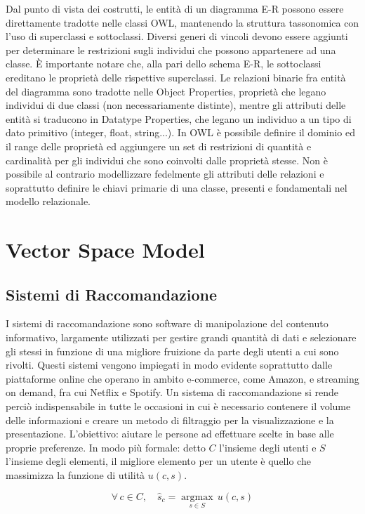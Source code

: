 \documentclass[Lau,binding=0.6cm,noexaminfo,oneside]{sapthesis}
\newcommand{\argmax}{\mathop{\mathrm{argmax}}\limits}
\begin{document}
Dal punto di vista dei costrutti, le entità di un diagramma E-R possono essere direttamente tradotte nelle classi OWL, mantenendo la struttura tassonomica con l'uso di superclassi e sottoclassi. Diversi generi di vincoli devono essere aggiunti per determinare le restrizioni sugli individui che possono appartenere ad una classe. \MakeUppercase{è} importante notare che, alla pari dello schema E-R, le sottoclassi ereditano le proprietà delle rispettive superclassi.
Le relazioni binarie fra entità del diagramma sono tradotte nelle Object Properties, proprietà che legano individui di due classi (non necessariamente distinte), mentre gli attributi delle entità si traducono in Datatype Properties, che legano un individuo a un tipo di dato primitivo (integer, float, string...). In OWL è possibile definire il dominio ed il range delle proprietà ed aggiungere un set di restrizioni di quantità e cardinalità per gli individui che sono coinvolti dalle proprietà stesse. Non è possibile al contrario modellizzare fedelmente gli attributi delle relazioni e soprattutto definire le chiavi primarie di una classe, presenti e fondamentali nel modello relazionale.\medskip

\chapter{Vector Space Model}
\section{Sistemi di Raccomandazione}

I sistemi di raccomandazione sono software di manipolazione del contenuto informativo, largamente utilizzati per gestire grandi quantità di dati e selezionare gli stessi in funzione di una migliore fruizione da parte degli utenti a cui sono rivolti. Questi sistemi vengono impiegati in modo evidente soprattutto dalle piattaforme online che operano in ambito e-commerce, come Amazon, e streaming on demand, fra cui Netflix e Spotify. Un sistema di raccomandazione si rende perciò indispensabile in tutte le occasioni in cui è necessario contenere il volume delle informazioni e creare un metodo di filtraggio per la visualizzazione e la presentazione. L'obiettivo: aiutare le persone ad effettuare scelte in base alle proprie preferenze. In modo più formale: detto $C$ l'insieme degli utenti e $S$ l'insieme degli elementi, il migliore elemento per un utente è quello che massimizza la funzione di utilità $u(c,s)$.

\[
\forall \, c \in C, \quad \hat{s}_c = \argmax_{s \in S} \, u(c, s)
\]
\end{document}
